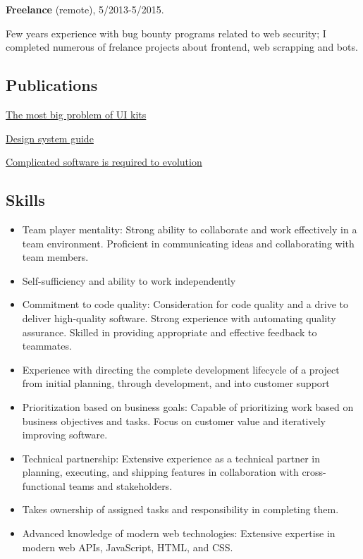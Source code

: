 \documentclass{vitonsky}
\begin{document}
\textbf{Freelance} (remote), 5/2013-5/2015.

Few years experience with bug bounty programs related to web security; I completed numerous of frelance projects about frontend, web scrapping and bots.

\subsection*{Publications}

\href{https://vitonsky.net/blog/2022/05/23/ui-kit-design/}{The most big problem of UI kits}

\href{https://vitonsky.net/blog/2023/03/18/design-system-guide/}{Design system guide}

\href{https://vitonsky.net/blog/2022/06/08/complicated-software/}{Complicated software is required to evolution}

\subsection*{Skills}

\begin{itemize}
\item
  Team player mentality: Strong ability to collaborate and work effectively in a team environment. Proficient in communicating ideas and collaborating with team members.
\item
  Self-sufficiency and ability to work independently
\item
  Commitment to code quality: Consideration for code quality and a drive to deliver high-quality software. Strong experience with automating quality assurance. Skilled in providing appropriate and effective feedback to teammates.
\item
  Experience with directing the complete development lifecycle of a project from initial planning, through development, and into customer support
\item
  Prioritization based on business goals: Capable of prioritizing work based on business objectives and tasks. Focus on customer value and iteratively improving software.
\item
  Technical partnership: Extensive experience as a technical partner in planning, executing, and shipping features in collaboration with cross-functional teams and stakeholders.
\item
  Takes ownership of assigned tasks and responsibility in completing them.
\item
  Advanced knowledge of modern web technologies: Extensive expertise in modern web APIs, JavaScript, HTML, and CSS.
\end{itemize}
\end{document}
